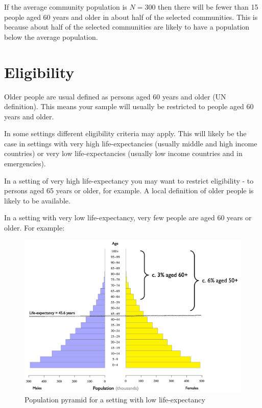 \documentclass[12pt,]{book}
\theoremstyle{definition}
\theoremstyle{definition}
\theoremstyle{definition}
\theoremstyle{remark}
\begin{document}
If the average community population is \(N = 300\) then there will be
fewer than 15 people aged 60 years and older in about half of the
selected communities. This is because about half of the selected
communities are likely to have a population below the average
population.

\newpage

\hypertarget{eligibility}{%
\section{Eligibility}\label{eligibility}}

Older people are usual defined as persons aged 60 years and older (UN
definition). This means your sample will usually be restricted to people
aged 60 years and older.

In some settings different eligibility criteria may apply. This will
likely be the case in settings with very high life-expectancies (usually
middle and high income countries) or very low life-expectancies (usually
low income countries and in emergencies).

In a setting of very high life-expectancy you may want to restrict
eligibility - to persons aged 65 years or older, for example. A local
definition of older people is likely to be available.

In a setting with very low life-expectancy, very few people are aged 60
years or older. For example:

\begin{figure}[h]

{\centering \includegraphics[width=16.67in]{figures/popPyramid2} 

}

\caption{Population pyramid for a setting with low life-expectancy}\label{fig:sample3}
\end{figure}
\end{document}
